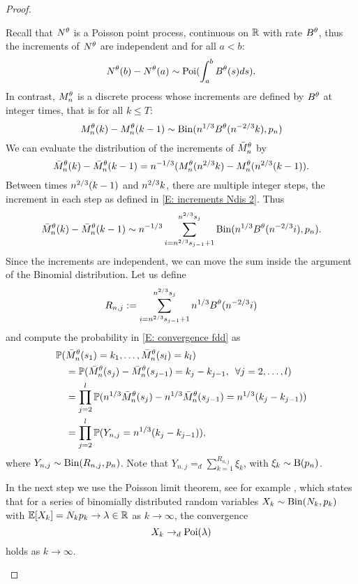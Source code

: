 \begin{proof}
\begin{proofpart}
Recall that $N^{\theta}$ is a Poisson point process, continuous on $\mathbb{R}$ with rate $B^{\theta}$,
thus the increments of $N^{\theta}$ are independent and for all $a<b$: 
\begin{equation}
N^{\theta}(b) - N^{\theta}(a) \sim \operatorname*{Poi}( \int_{a}^{b} B^{\theta}(s)ds).
\end{equation}
In contrast, $M_n^{\theta}$ is a discrete process whose increments are defined by $B^{\theta}$ at integer times, 
that is for all $k \leq T$: 
\begin{equation} \label{E: increments Ndis 2}
M_n^{\theta}(k) - M_n^{\theta}(k-1) \sim \operatorname*{Bin}(n^{1 / 3}B^{\theta}(n^{-2 / 3}k), p_n)
\end{equation}
We can evaluate the distribution of the increments of $\bar{M}_n^{\theta}$ by
\begin{equation}
\bar{M}_n^{\theta}(k) - \bar{M}_n^{\theta}(k-1) = n^{-1 / 3}( M_n^{\theta}(n^{2 / 3}k) - M_n^{\theta}(n^{2 / 3}(k-1)).
\end{equation}
Between times $n^{2 / 3}(k-1)$ and $n^{2 / 3}k$, there are multiple integer steps,
the increment in each step as defined in \eqref{E: increments Ndis 2}. 
Thus
\begin{equation}
\bar{M}_n^{\theta}(k) - \bar{M}_n^{\theta}(k-1) \sim n^{-1 / 3} \sum_{i=n^{2 / 3}s_{j-1}+1}^{n^{2 / 3}s_j} \operatorname*{Bin}( n^{1 / 3}B^{\theta}(n^{-2 / 3}i), p_n ).
\end{equation}
Since the increments are independent, we can move the sum inside the argument of the Binomial distribution.
Let us define 
\begin{equation*}
R_{n,j} := \sum_{i=n^{2 / 3}s_{j-1}+1}^{n^{2 / 3}s_j}n^{1 / 3}B^{\theta}(n^{-2 / 3}i)
\end{equation*}
and compute the probability in \eqref{E: convergence fdd} as
\begin{equation} \label{E: distribution Ndis}
\begin{aligned}
&\mathbb{P}(\bar{M}_n^{\theta}(s_1) = k_1, \dots, \bar{M}_n^{\theta}(s_l) = k_l) \\
&\quad = \mathbb{P}( \bar{M}_n^{\theta}(s_j) - \bar{M}_n^{\theta}(s_{j-1}) = k_j - k_{j-1}, \enspace \forall j=2,\dots,l ) \\
&\quad = \prod_{j=2}^{l} \mathbb{P}( n^{1 / 3}\bar{M}_n^{\theta}(s_j) - n^{1 / 3}\bar{M}_n^{\theta}(s_{j-1}) = n^{1 / 3}(k_j - k_{j-1})) \\
&\quad = \prod_{j=2}^{l} \mathbb{P}( Y_{n,j} = n^{1 / 3}(k_j - k_{j-1}) ),
\end{aligned}
\end{equation}
where $Y_{n,j} \sim \operatorname*{Bin}(R_{n,j}, p_n)$.
Note that $Y_{n,j} =_d \sum_{k=1}^{R_{n,j}} \xi_k$, with $\xi_k \sim \operatorname*{B}(p_n)$.

In the next step we use the Poisson limit theorem, see for example \cite[Theorem 3.7, p.79]{Klenke.2006},
which states that for a series of binomially distributed random variables $X_k \sim \operatorname*{Bin}(N_k, p_k)$
with $\mathbb{E}[X_k] = N_k p_k \rightarrow \lambda \in \mathbb{R}$ as $k \rightarrow \infty$,
the convergence 
\begin{equation}
	X_k \rightarrow_d \operatorname*{Poi}(\lambda)
\end{equation}
holds as $k \rightarrow \infty$.


\end{proofpart}
\end{proof}
